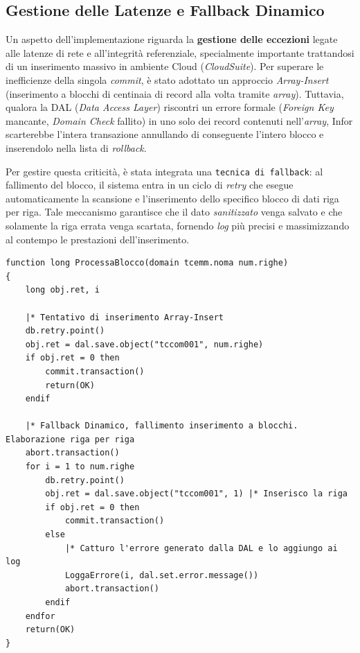 \subsection{Gestione delle Latenze e Fallback Dinamico}\label{subsec:gestione-delle-latenze-e-fallback-dinamico}
Un aspetto dell'implementazione riguarda la \textbf{gestione delle eccezioni} legate alle latenze di rete e all'integrità referenziale, specialmente importante trattandosi di un inserimento massivo in ambiente Cloud (\textit{CloudSuite}).
Per superare le inefficienze della singola \textit{commit}, è stato adottato un approccio \textit{Array-Insert} (inserimento a blocchi di centinaia di record alla volta tramite \textit{array}).
Tuttavia, qualora la DAL (\textit{Data Access Layer}) riscontri un errore formale (\textit{Foreign Key} mancante, \textit{Domain Check} fallito) in uno solo dei record contenuti nell'\textit{array}, Infor scarterebbe l'intera transazione annullando di conseguente l'intero blocco
e inserendolo nella lista di \textit{rollback}.

Per gestire questa criticità, è stata integrata una \texttt{tecnica di fallback}: al fallimento del blocco, il sistema entra in un ciclo di \textit{retry} che esegue automaticamente la scansione e l'inserimento dello specifico blocco di dati riga per riga. 
Tale meccanismo garantisce che il dato \textit{sanitizzato} venga salvato e che solamente la riga errata venga scartata, fornendo \textit{log} più precisi e massimizzando al contempo le prestazioni dell'inserimento.

\begin{listing}[H]
\begin{verbatim}
function long ProcessaBlocco(domain tcemm.noma num.righe)
{
    long obj.ret, i
    
    |* Tentativo di inserimento Array-Insert
    db.retry.point()
    obj.ret = dal.save.object("tccom001", num.righe)
    if obj.ret = 0 then
        commit.transaction()
        return(OK)
    endif
    
    |* Fallback Dinamico, fallimento inserimento a blocchi. Elaborazione riga per riga
    abort.transaction()
    for i = 1 to num.righe
        db.retry.point()
        obj.ret = dal.save.object("tccom001", 1) |* Inserisco la riga
        if obj.ret = 0 then
            commit.transaction()
        else
            |* Catturo l'errore generato dalla DAL e lo aggiungo ai log
            LoggaErrore(i, dal.set.error.message()) 
            abort.transaction()
        endif
    endfor
    return(OK)
}
\end{verbatim}
\caption{Pseudo-codice Baan C che mostra la logica iterativa di transazione e fallback riga-per-riga.}
\label{lst:dynamic_fallback}
\end{listing}

